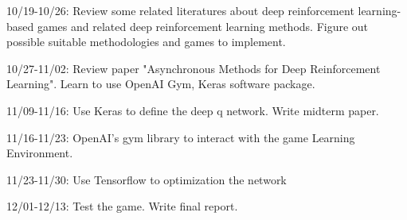 

10/19-10/26: Review some related literatures about deep reinforcement learning-based games and related deep reinforcement learning methods. Figure out possible suitable methodologies and games to implement.

10/27-11/02: Review paper "Asynchronous Methods for Deep Reinforcement Learning". Learn to use OpenAI Gym, Keras software package.

11/09-11/16: Use Keras to define the deep q network. Write midterm paper.

11/16-11/23: OpenAI's gym library to interact with the game Learning Environment.

11/23-11/30: Use Tensorflow to optimization the network

12/01-12/13: Test the game. Write final report.

